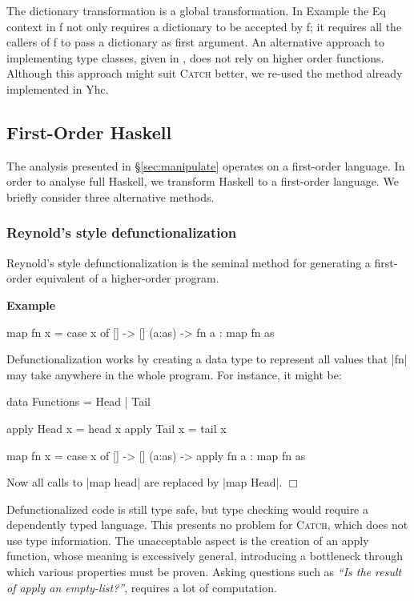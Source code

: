 \documentclass[preprint]{sigplanconf}
\let\cite=\citep
\newcommand{\C}[1]{\textsf{#1}}
\newcommand{\catch}{\textsc{Catch}}
\newcounter{exmp}
\newcommand{\yesexample}{\addtocounter{exmp}{1}\addvspace{2mm}\noindent\textbf{Example \arabic{exmp}}}
\newcommand{\noexample}{\hfill$\Box$\par\addvspace{2mm}}
\newcommand{\lastexample}{\arabic{exmp}}
\newenvironment{example}{\yesexample}{\noexample}
\begin{document}
The dictionary transformation is a global transformation. In Example \lastexample{} the \C{Eq} context in \C{f} not only requires a dictionary to be accepted by \C{f}; it requires all the callers of \C{f} to pass a dictionary as first argument. An alternative approach to implementing type classes, given in \cite{jones:dictionary_free}, does not rely on higher order functions. Although this approach might suit \catch{} better, we re-used the method already implemented in Yhc.

\subsection{First-Order Haskell}

The analysis presented in \S\ref{sec:manipulate} operates on a first-order language. In order to analyse full Haskell, we transform Haskell to a first-order language. We briefly consider three alternative methods.

\subsubsection{Reynold's style defunctionalization}

Reynold's style defunctionalization \citep{reynolds:defunc} is the seminal method for generating a first-order equivalent of a higher-order program.

\begin{example}
\begin{code}
map fn x = case  x of
                 []      -> []
                 (a:as)  -> fn a : map fn as
\end{code}

\noindent Defunctionalization works by creating a data type to represent all values that |fn| may take anywhere in the whole program. For instance, it might be:

\begin{code}
data Functions = Head | Tail

apply Head  x = head  x
apply Tail  x = tail  x

map fn x = case  x of
                 []      -> []
                 (a:as)  -> apply fn a : map fn as
\end{code}

Now all calls to |map head| are replaced by |map Head|.
\end{example}

Defunctionalized code is still type safe, but type checking would require a dependently typed language. This presents no problem for \catch{}, which does not use type information. The unacceptable aspect is the creation of an \C{apply} function, whose meaning is excessively general, introducing a bottleneck through which various properties must be proven. Asking questions such as \textit{``Is the result of \C{apply} an empty-list?''}, requires a lot of computation.
\end{document}
